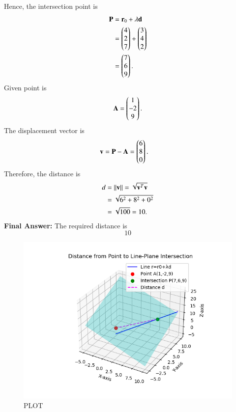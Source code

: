 \documentclass[journal]{IEEEtran}
\begin{document}
Hence, the intersection point is
\begin{align}
    \mathbf{P} &= \mathbf{r}_0 + \lambda \mathbf{d} \\
      &= \begin{pmatrix}4 \\ 2 \\ 7\end{pmatrix} + \begin{pmatrix}3 \\ 4 \\ 2\end{pmatrix} \\
      &= \begin{pmatrix}7 \\ 6 \\ 9\end{pmatrix}.
\end{align}
Given point is
\begin{align}
    \mathbf{A} = \begin{pmatrix}1 \\ -2 \\ 9\end{pmatrix}.
\end{align}
The displacement vector is
\begin{align}
    \mathbf{v} &= \mathbf{P} - \mathbf{A} = \begin{pmatrix}6 \\ 8 \\ 0\end{pmatrix}.
\end{align}
Therefore, the distance is
\begin{align}
    d &= \left\lVert\mathbf{v}\right\rVert = \sqrt{\mathbf{v}^T\mathbf{v}} \\
      &= \sqrt{6^2 + 8^2 + 0^2} \\
      &= \sqrt{100} = 10.
\end{align}
\textbf{Final Answer: } The required distance is 
\[
\boxed{10}
\]
\pagebreak
\begin{figure}[H]
    \centering
    \includegraphics[width=0.7\columnwidth]{figs/Figure_1.png}
    \caption{PLOT}
    \label{fig:fig1}
\end{figure}
\end{document}
